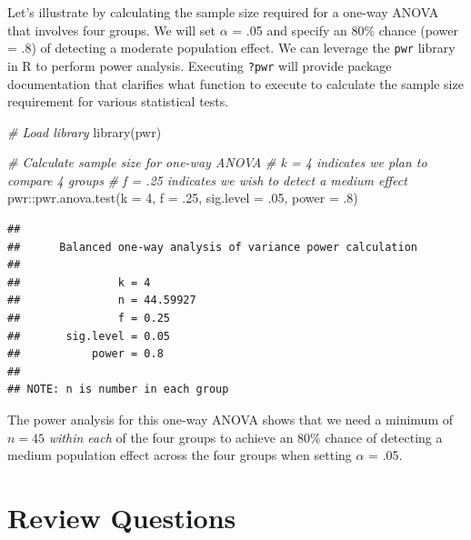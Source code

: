 \documentclass[
]{book}
\newenvironment{Shaded}{\begin{snugshade}}{\end{snugshade}}
\newcommand{\AttributeTok}[1]{\textcolor[rgb]{0.77,0.63,0.00}{#1}}
\newcommand{\CommentTok}[1]{\textcolor[rgb]{0.56,0.35,0.01}{\textit{#1}}}
\newcommand{\DecValTok}[1]{\textcolor[rgb]{0.00,0.00,0.81}{#1}}
\newcommand{\FunctionTok}[1]{\textcolor[rgb]{0.00,0.00,0.00}{#1}}
\newcommand{\NormalTok}[1]{#1}
\newcommand{\SpecialCharTok}[1]{\textcolor[rgb]{0.00,0.00,0.00}{#1}}
\begin{document}
Let's illustrate by calculating the sample size required for a one-way ANOVA that involves four groups. We will set \(\alpha\) = .05 and specify an 80\% chance (power = .8) of detecting a moderate population effect. We can leverage the \texttt{pwr} library in R to perform power analysis. Executing \texttt{?pwr} will provide package documentation that clarifies what function to execute to calculate the sample size requirement for various statistical tests.

\begin{Shaded}
\begin{Highlighting}[]
\CommentTok{\# Load library}
\FunctionTok{library}\NormalTok{(pwr)}

\CommentTok{\# Calculate sample size for one{-}way ANOVA}
\CommentTok{\# k = 4 indicates we plan to compare 4 groups}
\CommentTok{\# f = .25 indicates we wish to detect a medium effect}
\NormalTok{pwr}\SpecialCharTok{::}\FunctionTok{pwr.anova.test}\NormalTok{(}\AttributeTok{k =} \DecValTok{4}\NormalTok{, }\AttributeTok{f =}\NormalTok{ .}\DecValTok{25}\NormalTok{, }\AttributeTok{sig.level =}\NormalTok{ .}\DecValTok{05}\NormalTok{, }\AttributeTok{power =}\NormalTok{ .}\DecValTok{8}\NormalTok{)}
\end{Highlighting}
\end{Shaded}

\begin{verbatim}
## 
##      Balanced one-way analysis of variance power calculation 
## 
##               k = 4
##               n = 44.59927
##               f = 0.25
##       sig.level = 0.05
##           power = 0.8
## 
## NOTE: n is number in each group
\end{verbatim}

The power analysis for this one-way ANOVA shows that we need a minimum of \(n = 45\) \emph{within each} of the four groups to achieve an 80\% chance of detecting a medium population effect across the four groups when setting \(\alpha\) = .05.

\hypertarget{review-questions-6}{%
\section{Review Questions}\label{review-questions-6}}
\end{document}
